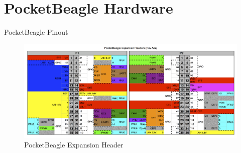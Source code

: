 \section{PocketBeagle Hardware}

\begin{frame}
   {PocketBeagle Pinout}
	     \begin{figure}[H]
		     \includegraphics[width=6in]{IMAGES/pb-pinout}
				       \caption{PocketBeagle Expansion Header}
	     \end{figure}
\end{frame}
